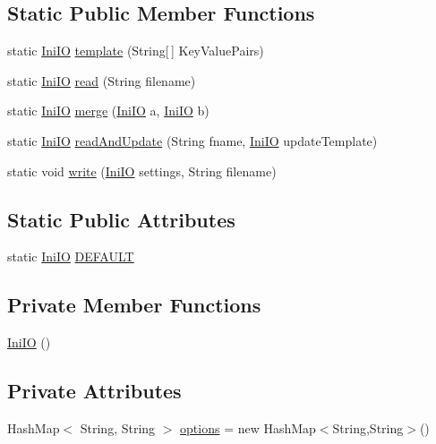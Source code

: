 \subsection*{Static Public Member Functions}
\begin{DoxyCompactItemize}
\item 
static \hyperlink{classqlib_1_1ide_1_1IniIO}{Ini\+IO} \hyperlink{classqlib_1_1ide_1_1IniIO_a02df232b5337879896c1e067b6e27601}{template} (String\mbox{[}$\,$\mbox{]} Key\+Value\+Pairs)
\item 
static \hyperlink{classqlib_1_1ide_1_1IniIO}{Ini\+IO} \hyperlink{classqlib_1_1ide_1_1IniIO_ae79dc4c2b69222d0e1725e70406da4c6}{read} (String filename)
\item 
static \hyperlink{classqlib_1_1ide_1_1IniIO}{Ini\+IO} \hyperlink{classqlib_1_1ide_1_1IniIO_aa8afcd3e7f28ea7d5324ab186650be1d}{merge} (\hyperlink{classqlib_1_1ide_1_1IniIO}{Ini\+IO} a, \hyperlink{classqlib_1_1ide_1_1IniIO}{Ini\+IO} b)
\item 
static \hyperlink{classqlib_1_1ide_1_1IniIO}{Ini\+IO} \hyperlink{classqlib_1_1ide_1_1IniIO_a25c322821c43bb710404a05210fb20be}{read\+And\+Update} (String fname, \hyperlink{classqlib_1_1ide_1_1IniIO}{Ini\+IO} update\+Template)
\item 
static void \hyperlink{classqlib_1_1ide_1_1IniIO_a10bafd582cb3816d23c93f1883b3e68b}{write} (\hyperlink{classqlib_1_1ide_1_1IniIO}{Ini\+IO} settings, String filename)
\end{DoxyCompactItemize}
\subsection*{Static Public Attributes}
\begin{DoxyCompactItemize}
\item 
static \hyperlink{classqlib_1_1ide_1_1IniIO}{Ini\+IO} \hyperlink{classqlib_1_1ide_1_1IniIO_a632b3fd3f02261c98a2aecf793c956a5}{D\+E\+F\+A\+U\+LT}
\end{DoxyCompactItemize}
\subsection*{Private Member Functions}
\begin{DoxyCompactItemize}
\item 
\hyperlink{classqlib_1_1ide_1_1IniIO_a0eadd42f5485d6bff447436734eda253}{Ini\+IO} ()
\end{DoxyCompactItemize}
\subsection*{Private Attributes}
\begin{DoxyCompactItemize}
\item 
Hash\+Map$<$ String, String $>$ \hyperlink{classqlib_1_1ide_1_1IniIO_a8676d10eea865975fca03579a63b9831}{options} = new Hash\+Map$<$String,String$>$()
\end{DoxyCompactItemize}


